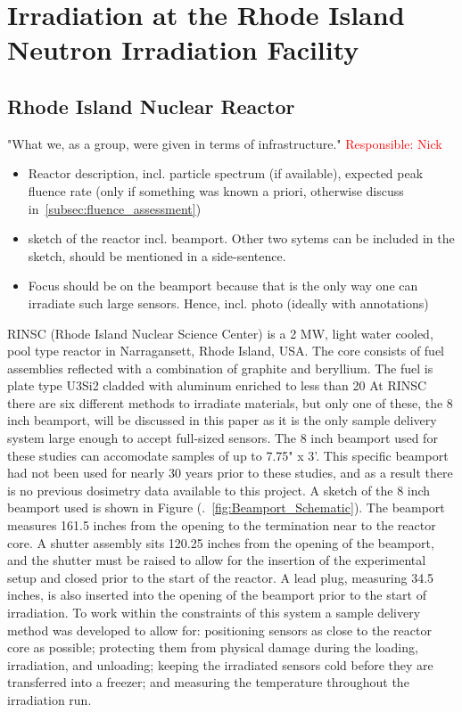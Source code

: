 \section{Irradiation at the Rhode Island Neutron Irradiation Facility}
\label{sec:irradiation}

\subsection{Rhode Island Nuclear Reactor}
\label{subsec:RINSC}
"What we, as a group, were given in terms of infrastructure." \textcolor{red}{Responsible: Nick}
\begin{itemize}
  \item Reactor description, incl. particle spectrum (if available), expected peak fluence rate (only if something was known a priori, otherwise discuss in~\ref{subsec:fluence_assessment})
  \item sketch of the reactor incl. beamport. Other two sytems can be included in the sketch, should be mentioned in a side-sentence.
  \item Focus should be on the beamport because that is the only way one can irradiate such large sensors. Hence, incl. photo (ideally with annotations)
\end{itemize}

RINSC (Rhode Island Nuclear Science Center) is a 2 MW, light water cooled, pool type reactor in Narragansett, Rhode Island, USA.
The core consists of fuel assemblies reflected with a combination of graphite and beryllium.
The fuel is plate type U3Si2 cladded with aluminum enriched to less than 20%
At RINSC there are six different methods to irradiate materials, but only one of these, the 8 inch beamport, will be discussed in this paper as it is the only sample delivery system large enough to accept full-sized sensors.
The 8 inch beamport used for these studies can accomodate samples of up to 7.75" x 3'.
This specific beamport had not been used for nearly 30 years prior to these studies, and as a result there is no previous dosimetry data available to this project.
A sketch of the 8 inch beamport used is shown in Figure (.~\ref{fig:Beamport_Schematic}).
The beamport measures 161.5 inches from the opening to the termination near to the reactor core.
A shutter assembly sits 120.25 inches from the opening of the beamport, and the shutter must be raised to allow for the insertion of the experimental setup and closed prior to the start of the reactor.
A lead plug, measuring 34.5 inches, is also inserted into the opening of the beamport prior to the start of irradiation.
To work within the constraints of this system a sample delivery method was developed to allow for: positioning sensors as close to the reactor core as possible; protecting them from physical damage during the loading, irradiation, and unloading; keeping the irradiated sensors cold before they are transferred into a freezer; and measuring the temperature throughout the irradiation run.   

